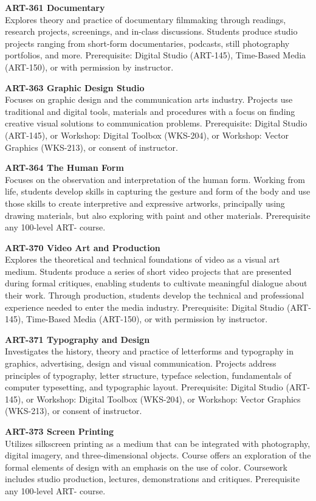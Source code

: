 \documentclass[
  letterpaper,
]{scrbook}
\begin{document}
\textbf{ART-361 Documentary}\\
Explores theory and practice of documentary filmmaking through readings,
research projects, screenings, and in-class discussions. Students
produce studio projects ranging from short-form documentaries, podcasts,
still photography portfolios, and more. Prerequisite: Digital Studio
(ART-145), Time-Based Media (ART-150), or with permission by instructor.

\textbf{ART-363 Graphic Design Studio}\\
Focuses on graphic design and the communication arts industry. Projects
use traditional and digital tools, materials and procedures with a focus
on finding creative visual solutions to communication problems.
Prerequisite: Digital Studio (ART-145), or Workshop: Digital Toolbox
(WKS-204), or Workshop: Vector Graphics (WKS-213), or consent of
instructor.

\textbf{ART-364 The Human Form}\\
Focuses on the observation and interpretation of the human form. Working
from life, students develop skills in capturing the gesture and form of
the body and use those skills to create interpretive and expressive
artworks, principally using drawing materials, but also exploring with
paint and other materials. Prerequisite any 100-level ART- course.

\textbf{ART-370 Video Art and Production}\\
Explores the theoretical and technical foundations of video as a visual
art medium. Students produce a series of short video projects that are
presented during formal critiques, enabling students to cultivate
meaningful dialogue about their work. Through production, students
develop the technical and professional experience needed to enter the
media industry. Prerequisite: Digital Studio (ART-145), Time-Based Media
(ART-150), or with permission by instructor.

\textbf{ART-371 Typography and Design}\\
Investigates the history, theory and practice of letterforms and
typography in graphics, advertising, design and visual communication.
Projects address principles of typography, letter structure, typeface
selection, fundamentals of computer typesetting, and typographic layout.
Prerequisite: Digital Studio (ART-145), or Workshop: Digital Toolbox
(WKS-204), or Workshop: Vector Graphics (WKS-213), or consent of
instructor.

\textbf{ART-373 Screen Printing}\\
Utilizes silkscreen printing as a medium that can be integrated with
photography, digital imagery, and three-dimensional objects. Course
offers an exploration of the formal elements of design with an emphasis
on the use of color. Coursework includes studio production, lectures,
demonstrations and critiques. Prerequisite any 100-level ART- course.
\end{document}
